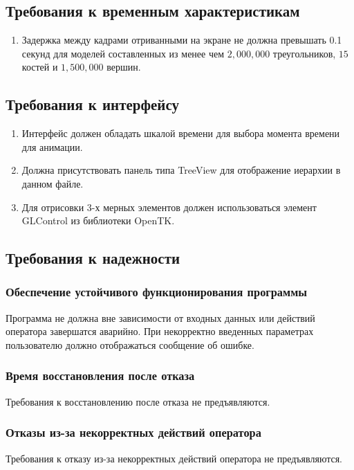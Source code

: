 \subsection{Требования к временным характеристикам}
\begin{enumerate}
\item Задержка между кадрами отриванными на экране не должна превышать 0.1 секунд для моделей составленных из менее чем $2,000,000$ треугольников, $15$ костей и  $1,500,000$ вершин.
\end{enumerate}


\subsection{Требования к интерфейсу}
\begin{enumerate}
\item Интерфейс должен обладать шкалой времени для выбора момента времени для анимации.
\item Должна присутствовать панель типа TreeView для отображение иерархии в данном файле.
\item Для отрисовки 3-х мерных элементов должен использоваться элемент GLControl из библиотеки OpenTK.
\end{enumerate}


\subsection{Требования к надежности}
\subsubsection{Обеспечение устойчивого функционирования программы}
Программа не должна вне зависимости от входных данных или действий оператора завершатся аварийно. При некорректно введенных параметрах пользователю должно отображаться сообщение об ошибке.
\subsubsection{Время восстановления после отказа}
Требования к восстановлению после отказа не предъявляются.
\subsubsection{Отказы из-за некорректных действий оператора}
Требования к отказу из-за некорректных действий оператора не предъявляются.
